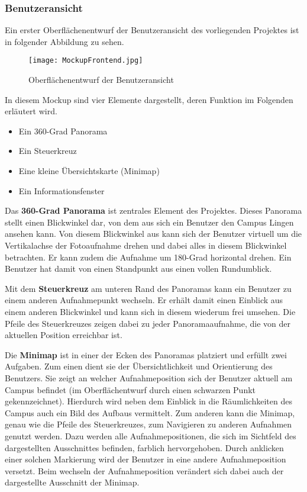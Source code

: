\subsubsection{Benutzeransicht}
\label{sec:Benutzeransicht}

Ein erster Oberflächenentwurf der Benutzeransicht des vorliegenden Projektes ist in folgender Abbildung zu sehen.

\begin{figure}[htb]
\centering
\texttt{[image: MockupFrontend.jpg]}
\caption[Mockup Benutzeransicht]{Oberflächenentwurf der
Benutzeransicht\protect\footnotemark}
\label{fig:MockupFrontend}
\end{figure}

In diesem Mockup sind vier Elemente dargestellt, deren Funktion im Folgenden erläutert wird.

\begin{itemize}
 \item Ein 360-Grad Panorama
 \item Ein Steuerkreuz
 \item Eine kleine Übersichtskarte (Minimap)
 \item Ein Informationsfenster
\end{itemize}

Das \textbf{360-Grad Panorama} ist zentrales Element des Projektes. Dieses Panorama stellt einen Blickwinkel dar, von dem aus sich ein Benutzer den Campus Lingen ansehen kann. Von diesem Blickwinkel aus kann sich der Benutzer virtuell um die Vertikalachse der Fotoaufnahme drehen und dabei alles in diesem Blickwinkel betrachten. Er kann zudem die Aufnahme um 180-Grad horizontal drehen. Ein Benutzer hat damit von einen Standpunkt aus einen vollen Rundumblick.

Mit dem \textbf{Steuerkreuz} am unteren Rand des Panoramas kann ein Benutzer zu einem anderen Aufnahmepunkt wechseln. Er erhält damit einen Einblick aus einem anderen Blickwinkel und kann sich in diesem wiederum frei umsehen. Die Pfeile des Steuerkreuzes zeigen dabei zu jeder Panoramaaufnahme, die von der aktuellen Position erreichbar ist.

Die \textbf{Minimap} ist in einer der Ecken des Panoramas platziert und erfüllt zwei Aufgaben. Zum einen dient sie der Übersichtlichkeit und Orientierung des Benutzers. Sie zeigt an welcher Aufnahmeposition sich der Benutzer aktuell am Campus befindet (im Oberflächentwurf durch einen schwarzen Punkt gekennzeichnet). Hierdurch wird neben dem Einblick in die Räumlichkeiten des Campus auch ein Bild des Aufbaus vermittelt.
Zum anderen kann die Minimap, genau wie die Pfeile des Steuerkreuzes, zum Navigieren zu anderen Aufnahmen genutzt werden. Dazu werden alle Aufnahmepositionen, die sich im Sichtfeld des dargestellten Ausschnittes befinden, farblich hervorgehoben. Durch anklicken einer solchen Markierung wird der Benutzer in eine andere Aufnahmeposition versetzt. Beim wechseln der Aufnahmeposition verändert sich dabei auch der dargestellte Ausschnitt der Minimap.

